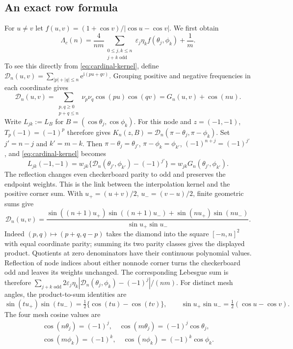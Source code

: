 \subsection{An exact row formula}
For $u\ne v$ let $f(u,v)=(1+\cos v)/|\cos u-\cos v|$. We first obtain
\begin{equation}\label{cu:positive}
 \Lambda_c(n)=\frac4{nm}
 \sum_{\substack{0\leq j,k\leq n\\j+k\text{ odd}}}
       \varepsilon_j\eta_k f(\theta_j,\phi_k)+\frac1m.
\end{equation}
To see this directly from \eqref{eq:cardinal-kernel}, define
$\mathcal{D}_n(u,v)=\sum_{|p|+|q|\leq n}\mathrm e^{\mathrm i(pu+qv)}$. Grouping positive and negative frequencies in each coordinate gives
\[
 \mathcal D_n(u,v)=\sum_{\substack{p,q\geq0\\p+q\leq n}}
       \nu_p\nu_q\cos(pu)\cos(qv)=G_n(u,v)+\cos(nu).
\]
Write $L_{jk}:=L_B$ for $B=(\cos\theta_j,\cos\phi_k)$.
For this node and $z=(-1,-1)$,
$T_p(-1)=(-1)^p$ therefore gives
$K_n(z,B)=\mathcal D_n(\pi-\theta_j,\pi-\phi_k)$.
Set $j'=n-j$ and $k'=m-k$. Then
$\pi-\theta_j=\theta_{j'}$, $\pi-\phi_k=\phi_{k'}$,
$(-1)^{n+j}=(-1)^{j'}$, and \eqref{eq:cardinal-kernel} becomes
\[
 L_{jk}(-1,-1)=w_{jk}
 \{\mathcal D_n(\theta_{j'},\phi_{k'})-(-1)^{j'}\}
 =w_{jk}G_n(\theta_{j'},\phi_{k'}).
\]
The reflection changes even checkerboard parity to odd and preserves
the endpoint weights. This is the link between the interpolation kernel
and the positive corner sum. With
$u_+=(u+v)/2$, $u_-=(v-u)/2$, finite geometric sums give
\[
 \mathcal{D}_n(u,v)=\frac{\sin((n+1)u_+)\sin((n+1)u_-)+\sin(nu_+)\sin(nu_-)}
                  {\sin u_+\sin u_-}.
\]
Indeed $(p,q)\mapsto(p+q,q-p)$ takes the diamond into the square
$[-n,n]^2$ with equal coordinate parity; summing its two parity classes
gives the displayed product. Quotients at zero denominators have their
continuous polynomial values. Reflection of node indices about either
nonnode corner turns the checkerboard odd and leaves its weights unchanged.
The corresponding Lebesgue sum is therefore
$\sum_{j+k\text{ odd}}2\varepsilon_j\eta_k
 |\mathcal{D}_n(\theta_j,\phi_k)-(-1)^j|/(nm)$.
For distinct mesh angles, the product-to-sum identities are
\[
 \sin(tu_+)\sin(tu_-)=\tfrac12\{\cos(tu)-\cos(tv)\},
 \qquad \sin u_+\sin u_-=\tfrac12(\cos u-\cos v).
\]
The four mesh cosine values are
\[
 \begin{gathered}
 \cos(n\theta_j)=(-1)^j,\quad
 \cos(m\theta_j)=(-1)^j\cos\theta_j,\\
 \cos(m\phi_k)=(-1)^k,\quad
 \cos(n\phi_k)=(-1)^k\cos\phi_k.
 \end{gathered}
\]

